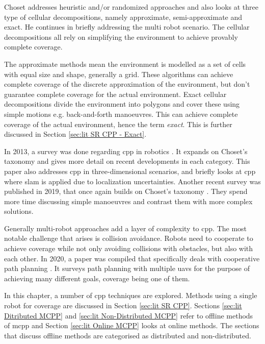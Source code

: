 Choset addresses heuristic and/or randomized approaches and also looks at three type of cellular decompositions, namely approximate, semi-approximate and exact. He continues in briefly addressing the multi robot scenario. The cellular decompositions all rely on simplifying the environment to achieve provably complete coverage. 

The approximate methods mean the environment is modelled as a set of cells with equal size and shape, generally a grid. These algorithms can achieve complete coverage of the discrete approximation of the environment, but don't guarantee complete coverage for the actual environment. Exact cellular decompositions divide the environment into polygons and cover these using simple motions e.g. back-and-forth manoeuvres. This can achieve complete coverage of the actual environment, hence the term \emph{exact}. This is further discussed in Section \ref{sec:lit SR CPP - Exact}. 

In 2013, a survey was done regarding \ac{cpp} in robotics \cite{CPP-Survey-2013}. It expands on Choset's taxonomy and gives more detail on recent developments in each category. This paper also addresses \ac{cpp} in three-dimensional scenarios, and briefly looks at \ac{cpp} where \ac{slam} is applied due to localization uncertainties. 
Another recent survey was published in 2019, that once again builds on Choset's taxonomy \cite{CPP-Survey-2019}. They spend more time discussing simple manoeuvres and contrast them with more complex solutions.

Generally multi-robot approaches add a layer of complexity to \ac{cpp}. The most notable challenge that arises is collision avoidance. Robots need to cooperate to achieve coverage while not only avoiding collisions with obstacles, but also with each other. In 2020, a paper was compiled that specifically deals with cooperative path planning \cite{Zhang2020}. It surveys path planning with multiple \acp{uav} for the purpose of achieving many different goals, coverage being one of them.


In this chapter, a number of \ac{cpp} techniques are explored. Methods using a single robot for coverage are discussed in Section \ref{sec:lit SR CPP}. Sections \ref{sec:lit Ditributed MCPP} and \ref{sec:lit Non-Distributed MCPP} refer to offline methods of \ac{mcpp} and Section \ref{sec:lit Online MCPP} looks at online methods. The sections that discuss offline methods are categorised as distributed and non-distributed.

